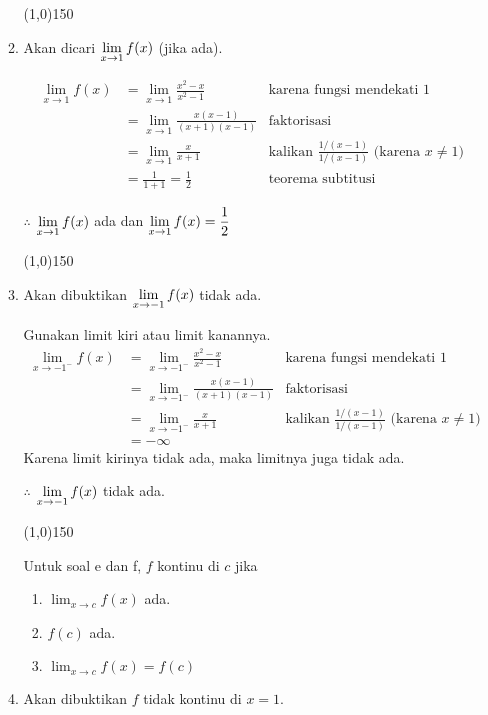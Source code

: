 \begin{enumerate}[leftmargin=*, label={\arabic*}.]
\begin{enumerate}[label={\alph*}.]
\begin{center}\line(1,0){150}\end{center}


    \item Akan dicari $\displaystyle \lim_{x \to 1} f(x)$ (jika ada).
    
    \begin{align*}
        \lim_{x \to 1} f(x) 
        &= \lim_{x \to 1} \frac{x^{2}-x}{x^{2}-1}
        &\text{karena fungsi mendekati $1$}\\
        &= \lim_{x \to 1} \frac{x(x-1)}{(x+1)(x-1)}
        &\text{faktorisasi}\\
        &=\lim_{x \to 1} \frac{x}{x+1}
        &\text{kalikan $\frac{1/(x-1)}{1/(x-1)}$ (karena $x \neq 1$)}\\
        &= \frac{1}{1+1} = \frac{1}{2} 
        &\text{teorema subtitusi}
    \end{align*} 

    $\therefore$ $\displaystyle \lim_{x \to 1} f(x)$ ada dan 
    $\displaystyle \lim_{x \to 1} f(x) = \frac{1}{2}$


\begin{center}\line(1,0){150}\end{center}  


    \item Akan dibuktikan $\displaystyle \lim_{x \to -1} f(x)$ tidak ada.
    
    Gunakan limit kiri atau limit kanannya.
    \begin{align*}
        \lim_{x \to -1^{-}} f(x) 
        &= \lim_{x \to -1^{-}} \frac{x^{2}-x}{x^{2}-1}
        &\text{karena fungsi mendekati $1$}\\
        &= \lim_{x \to -1^{-}} \frac{x(x-1)}{(x+1)(x-1)}
        &\text{faktorisasi}\\
        &= \lim_{x \to -1^{-}} \frac{x}{x+1}
        &\text{kalikan $\frac{1/(x-1)}{1/(x-1)}$ (karena $x \neq 1$)}\\
        &= -\infty
    \end{align*} 
    Karena limit kirinya tidak ada, maka limitnya juga tidak ada.

    $\therefore$ $\displaystyle \lim_{x \to -1} f(x)$ tidak ada. 


\begin{center}\line(1,0){150}\end{center}    


    Untuk soal e dan f, $f$ kontinu di $c$ jika
    \begin{enumerate}[label={\arabic*}.]
        \item $\lim_{x\to c} f(x)$ ada.
        \item $f(c)$ ada.
        \item $\lim_{x\to c} f(x) = f(c)$
    \end{enumerate}
    \item Akan dibuktikan $f$ tidak kontinu di $x = 1$.
    

\end{enumerate}
\end{enumerate}
